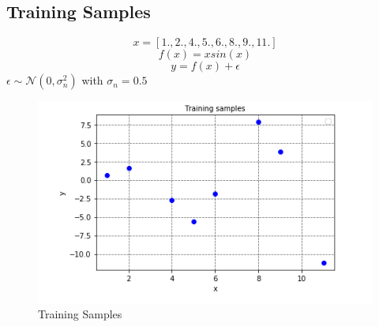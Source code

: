 \documentclass{article}
\begin{document}
\subsection{Training Samples}
$$ x = [1., 2., 4., 5., 6., 8., 9., 11.]$$
$$ f(x)= xsin(x)$$
$$ y = f(x)+\epsilon$$
$\epsilon \sim \mathcal{N}{\left(0, \sigma_{n}^2\right)}$ with $\sigma_{n}=0.5$
\begin{figure}[]
    \centering
    \includegraphics[width=12cm]{Capture.PNG}
    \caption{Training Samples}
    \label{fig:Training samples}
\end{figure}
\end{document}
